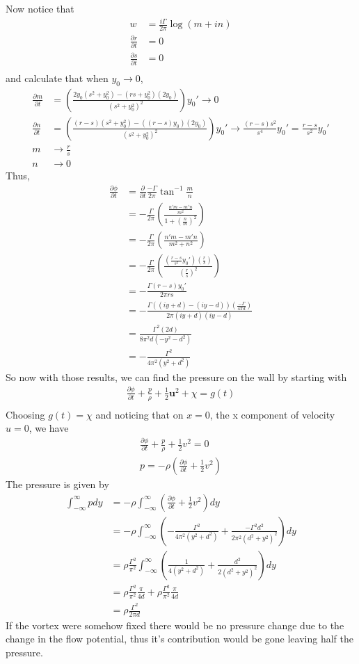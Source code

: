 \documentclass[12pt]{article}
\newcommand{\eq}[1]{\begin{align*}#1\end{align*}}
\newcommand{\p}[2]{\frac{\partial#1}{\partial#2}}
\begin{document}
Now notice that
\eq{
	w &= \frac{i\Gamma}{2\pi}\log(m + in)\\
	\p{r}{t} &= 0\\
	\p{s}{t} &= 0\\
}
and calculate that when $y_0 \rightarrow 0$,
\eq{
	\p{m}{t} &= \left(\frac{2y_0(s^2 + y_0^2) - (rs + y_0^2)(2y_0)}{(s^2 + y_0^2)^2}\right)y_0' \rightarrow 0\\
	\p{n}{t} &= \left( \frac{(r-s)(s^2 + y_0^2) - ((r-s)y_0)(2y_0)}{(s^2 + y_0^2)^2} \right)y_0' \rightarrow \frac{(r-s)s^2}{s^4}y_0' = \frac{r-s}{s^2}y_0'\\
	m &\rightarrow \frac{r}{s}\\
	n &\rightarrow 0
}
Thus,
\eq{
	\p{\phi}{t} &= \p{}{t}\frac{-\Gamma}{2\pi}\tan^{-1}\frac{m}{n}\\
	&= -\frac{\Gamma}{2\pi}\left( \frac{\frac{n'm - m'n}{m^2}}{1 + (\frac{n}{m})^2}\right)\\
	&= -\frac{\Gamma}{2\pi}\left( \frac{n'm - m'n}{m^2 + n^2}\right)\\
	&= -\frac{\Gamma}{2\pi}\left( \frac{\left(\frac{r-s}{s^2}y_0'\right)(\frac{r}{s})}{(\frac{r}{s})^2}\right)\\
	&= -\frac{\Gamma(r-s)y_0'}{2\pi rs}\\
	&= -\frac{\Gamma((iy + d) - (iy - d)) \left(\frac{-\Gamma}{4\pi d}\right) }{2\pi (iy + d)(iy - d)}\\
	&= \frac{\Gamma^2(2d)}{8\pi^2 d(-y^2 - d^2)}\\
	&= -\frac{\Gamma^2}{4\pi^2(y^2 + d^2)}
}
So now with those results, we can find the pressure on the wall by starting with
\eq{
	\p{\phi}{t} + \frac{p}{\rho} + \frac{1}{2}\bm{u}^2 + \chi = g(t)\\
}
Choosing $g(t) = \chi$ and noticing that on $x = 0$, the x component of velocity $u = 0$, we have
\eq{
	\p{\phi}{t} + \frac{p}{\rho} + \frac{1}{2}v^2 = 0\\
	p = -\rho\left(\p{\phi}{t} + \frac{1}{2}v^2\right)
}
The pressure is given by
\eq{
	\int_{-\infty}^\infty p dy &= -\rho\int_{-\infty}^\infty\left(\p{\phi}{t} + \frac{1}{2}v^2\right)dy\\
	&= -\rho\int_{-\infty}^\infty\left(-\frac{\Gamma^2}{4\pi^2(y^2 + d^2)} + \frac{-\Gamma^2 d^2}{2\pi^2(d^2 + y^2)^2}\right)dy\\
	&= \rho\frac{\Gamma^2}{\pi^2}\int_{-\infty}^\infty\left(\frac{1}{4(y^2 + d^2)} + \frac{d^2}{2(d^2 + y^2)^2}\right)dy\\
	&= \rho\frac{\Gamma^2}{\pi^2}\frac{\pi}{4d} + \rho\frac{\Gamma^2}{\pi^2}\frac{\pi}{4d}\\
	&= \rho\frac{\Gamma^2}{2\pi d}
}
If the vortex were somehow fixed there would be no pressure change due to the change in the flow potential, thus it's contribution would be gone leaving half the pressure.
\end{document}
